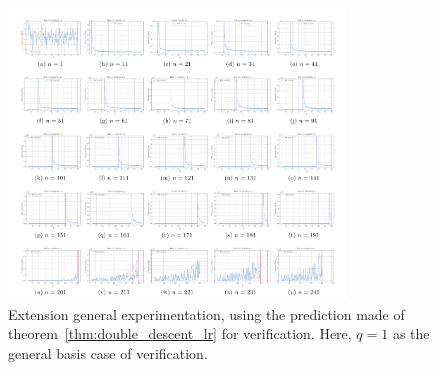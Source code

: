 \documentclass[10pt]{article} %
\begin{document}
\begin{figure}[htb]
    \centering
    \includegraphics[width=0.8\textwidth]{pdf/linear_gen.pdf}
    \caption{Extension general experimentation, using the prediction made of theorem~\ref{thm:double_descent_lr} for verification. Here, $q=1$ as the general basis case of verification. }
\end{figure}
\end{document}
